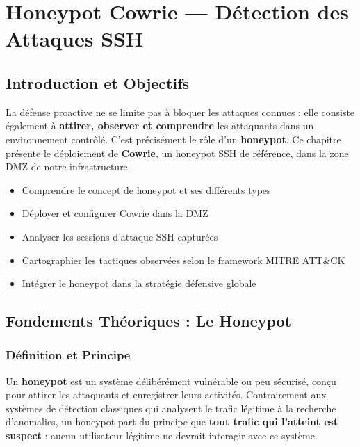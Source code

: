 \documentclass[12pt,a4paper,openany]{report}
\begin{document}
\chapter{Honeypot Cowrie --- Détection des Attaques SSH}
\label{chap:cowrie}

\section{Introduction et Objectifs}

La défense proactive ne se limite pas à bloquer les attaques connues : elle consiste également à
\textbf{attirer, observer et comprendre} les attaquants dans un environnement contrôlé. C'est
précisément le rôle d'un \textbf{honeypot}. Ce chapitre présente le déploiement de
\textbf{Cowrie}, un honeypot SSH de référence, dans la zone DMZ de notre infrastructure.

\begin{tcolorbox}[colback=primary!5!white, colframe=primary, title=\textbf{Objectifs de ce Chapitre}]
\begin{itemize}
    \item Comprendre le concept de honeypot et ses différents types
    \item Déployer et configurer Cowrie dans la DMZ
    \item Analyser les sessions d'attaque SSH capturées
    \item Cartographier les tactiques observées selon le framework MITRE ATT\&CK
    \item Intégrer le honeypot dans la stratégie défensive globale
\end{itemize}
\end{tcolorbox}

\section{Fondements Théoriques : Le Honeypot}

\subsection{Définition et Principe}

Un \textbf{honeypot} est un système délibérément vulnérable ou peu sécurisé, conçu pour attirer les
attaquants et enregistrer leurs activités. Contrairement aux systèmes de détection classiques qui
analysent le trafic légitime à la recherche d'anomalies, un honeypot part du principe que
\textbf{tout trafic qui l'atteint est suspect} : aucun utilisateur légitime ne devrait interagir
avec ce système.
\end{document}
